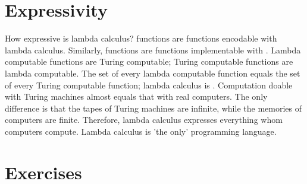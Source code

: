 \section{Expressivity}

How expressive is lambda calculus?  functions are
functions encodable with lambda calculus. Similarly, 
functions are functions implementable with . Lambda
computable functions are Turing computable; Turing computable functions are
lambda computable. The set of every lambda computable function equals the set of
every Turing computable function; lambda calculus is .
Computation doable with Turing machines almost equals that with real computers.
The only difference is that the tapes of Turing machines are infinite, while the
memories of computers are finite. Therefore, lambda calculus expresses everything
whom computers compute. Lambda calculus is 'the only' programming language.

\section{Exercises}
